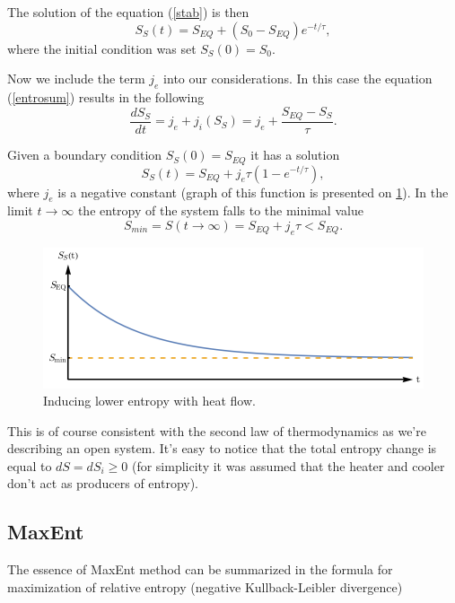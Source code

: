 \documentclass[a4paper,12pt,nofootinbib]{article}
\begin{document}
The solution of the equation (\ref{stab}) is then
\begin{equation}
S_S(t) =S_{EQ}+(S_0-S_{EQ})e^{-t/\tau}, 
\end{equation}
where the initial condition was set $S_S(0)=S_0$.


Now we include the term $j_e$ into our considerations.
In this case the equation (\ref{entrosum}) results in the following 
\begin{equation}
\frac{dS_S}{dt}=j_e + j_i\left(S_S\right)=j_e +\frac{S_{EQ}-S_S}{\tau}.
\label{dSSdt}
\end{equation} 

 
Given a boundary condition $S_S(0) =S_{EQ}$ it has a solution
\begin{equation}
S_S(t)=S_{EQ}+j_e\tau \left(1-e^{-t/\tau }\right),
\end{equation} 
where $j_e$ is a negative constant (graph of this function is presented on \ref{Fig4}). 
In the limit $t\rightarrow \infty$ the entropy of the system falls to the minimal value
\begin{equation}
S_{min}=S(t\rightarrow \infty) =S_{EQ}+j_e \tau < S_{EQ}.
\end{equation}

\begin{figure}[ht!]
\centering \includegraphics[width=12cm]{wykres3} 
\caption{Inducing lower entropy with heat flow.}
\label{Fig4} 
\end{figure}

This is of course consistent with the second law of thermodynamics as we're describing an open system.
It's easy to notice that the total entropy change is equal to $dS=dS_i \geq 0$ (for simplicity it was assumed that the heater and cooler don't act as producers of entropy).




\subsection{MaxEnt}

The essence of MaxEnt method can be summarized in the formula for maximization of relative entropy (negative Kullback-Leibler divergence)
\end{document}
